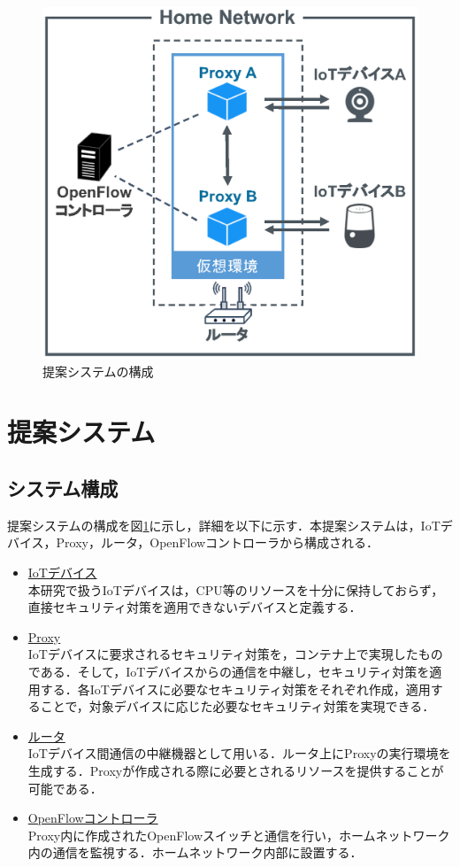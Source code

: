 \documentclass[a4paper,10pt,twocolumn,uplatex]{jsarticle}
\begin{document}
\begin{figure}[!tb]
  \centering
  \includegraphics[width=\linewidth]{img/system.eps}
  \caption{提案システムの構成}
  \label{fig:system}
\end{figure}

\section{提案システム}
\subsection{システム構成}
提案システムの構成を図\ref{fig:system}に示し，詳細を以下に示す．本提案システムは，IoTデバイス，Proxy，ルータ，OpenFlowコントローラから構成される．
\begin{itemize}
  \item \underline{IoTデバイス}\mbox{}\\
        本研究で扱うIoTデバイスは，CPU等のリソースを十分に保持しておらず，直接セキュリティ対策を適用できないデバイスと定義する．
  \item \underline{Proxy}\mbox{}\\
        IoTデバイスに要求されるセキュリティ対策を，コンテナ上で実現したものである．そして，IoTデバイスからの通信を中継し，セキュリティ対策を適用する．各IoTデバイスに必要なセキュリティ対策をそれぞれ作成，適用することで，対象デバイスに応じた必要なセキュリティ対策を実現できる．
  \item \underline{ルータ}\mbox{}\\
        IoTデバイス間通信の中継機器として用いる．ルータ上にProxyの実行環境を生成する．Proxyが作成される際に必要とされるリソースを提供することが可能である．
  \item \underline{OpenFlowコントローラ}\mbox{}\\
        Proxy内に作成されたOpenFlowスイッチと通信を行い，ホームネットワーク内の通信を監視する．ホームネットワーク内部に設置する．
\end{itemize}
\end{document}
